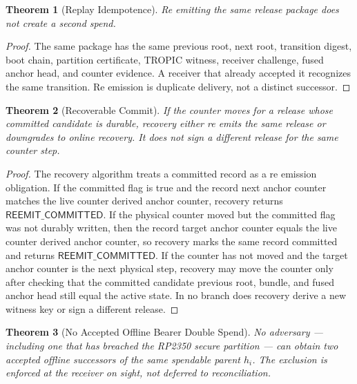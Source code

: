\documentclass[11pt]{article}
\newtheorem{theorem}{Theorem}
\theoremstyle{definition}
\theoremstyle{remark}
\begin{document}
\begin{theorem}[Replay Idempotence]
Re emitting the same release package does not create a second spend.
\end{theorem}

\begin{proof}
The same package has the same previous root, next root, transition digest, boot chain, partition
certificate, TROPIC witness, receiver challenge, fused anchor head, and counter evidence. A
receiver that already accepted it recognizes the same transition. Re emission is duplicate
delivery, not a distinct successor.
\end{proof}

\begin{theorem}[Recoverable Commit]
If the counter moves for a release whose committed candidate is durable, recovery either re emits
the same release or downgrades to online recovery. It does not sign a different release for the
same counter step.
\end{theorem}

\begin{proof}
The recovery algorithm treats a committed record as a re emission obligation. If the committed flag
is true and the record next anchor counter matches the live counter derived anchor counter,
recovery returns \(\mathsf{REEMIT\_COMMITTED}\). If the physical counter moved but the committed
flag was not durably written, then the record target anchor counter equals the live counter derived
anchor counter, so recovery marks the same record committed and returns
\(\mathsf{REEMIT\_COMMITTED}\). If the counter has not moved and the target anchor counter is the
next physical step, recovery may move the counter only after checking that the committed candidate
previous root, bundle, and fused anchor head still equal the active state. In no branch does
recovery derive a new witness key or sign a different release.
\end{proof}

\begin{theorem}[No Accepted Offline Bearer Double Spend]
No adversary --- including one that has breached the RP2350 secure partition --- can obtain two
accepted offline successors of the same spendable parent \(h_i\). The exclusion is enforced at the
receiver on sight, not deferred to reconciliation.
\end{theorem}
\end{document}
